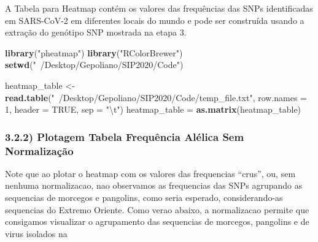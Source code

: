 \documentclass[
]{article}
\newenvironment{Shaded}{\begin{snugshade}}{\end{snugshade}}
\newcommand{\CharTok}[1]{\textcolor[rgb]{0.31,0.60,0.02}{#1}}
\newcommand{\DataTypeTok}[1]{\textcolor[rgb]{0.13,0.29,0.53}{#1}}
\newcommand{\DecValTok}[1]{\textcolor[rgb]{0.00,0.00,0.81}{#1}}
\newcommand{\FunctionTok}[1]{\textcolor[rgb]{0.00,0.00,0.00}{#1}}
\newcommand{\KeywordTok}[1]{\textcolor[rgb]{0.13,0.29,0.53}{\textbf{#1}}}
\newcommand{\NormalTok}[1]{#1}
\newcommand{\OtherTok}[1]{\textcolor[rgb]{0.56,0.35,0.01}{#1}}
\newcommand{\StringTok}[1]{\textcolor[rgb]{0.31,0.60,0.02}{#1}}
\begin{document}
\begin{Shaded}
\end{Shaded}

A Tabela para Heatmap contém os valores das frequências das SNPs
identificadas em SARS-CoV-2 em diferentes locais do mundo e pode ser
construída usando a extração do genótipo SNP mostrada na etapa 3.

\begin{Shaded}
\begin{Highlighting}[]
\KeywordTok{library}\NormalTok{(}\StringTok{"pheatmap"}\NormalTok{)}
\KeywordTok{library}\NormalTok{(}\StringTok{"RColorBrewer"}\NormalTok{)}
\KeywordTok{setwd}\NormalTok{(}\StringTok{"~/Desktop/Gepoliano/SIP2020/Code"}\NormalTok{)}

\NormalTok{heatmap_table <-}\StringTok{ }\KeywordTok{read.table}\NormalTok{(}\StringTok{"~/Desktop/Gepoliano/SIP2020/Code/temp_file.txt"}\NormalTok{, }\DataTypeTok{row.names =} \DecValTok{1}\NormalTok{, }\DataTypeTok{header =} \OtherTok{TRUE}\NormalTok{, }\DataTypeTok{sep =} \StringTok{"}\CharTok{\textbackslash{}t}\StringTok{"}\NormalTok{)}
\NormalTok{heatmap_table =}\StringTok{ }\KeywordTok{as.matrix}\NormalTok{(heatmap_table)}
\end{Highlighting}
\end{Shaded}

\hypertarget{plotagem-tabela-frequuxeancia-aluxe9lica-sem-normalizauxe7uxe3o}{%
\subsubsection{3.2.2) Plotagem Tabela Frequência Alélica Sem
Normalização}\label{plotagem-tabela-frequuxeancia-aluxe9lica-sem-normalizauxe7uxe3o}}

Note que ao plotar o heatmap com os valores das frequencias ``crus'',
ou, sem nenhuma normalizacao, nao observamos as frequencias das SNPs
agrupando as sequencias de morcegos e pangolins, como seria esperado,
considerando-as sequencias do Extremo Oriente. Como verao abaixo, a
normalizacao permite que consigamos visualizar o agrupamento das
sequencias de morcegos, pangolins e de virus isolados na
\end{document}
